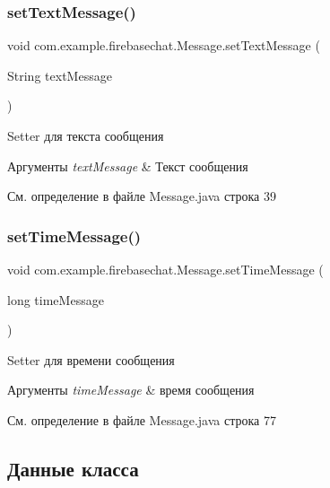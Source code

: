 \subsubsection{\texorpdfstring{set\+Text\+Message()}{setTextMessage()}}
{\footnotesize\ttfamily void com.\+example.\+firebasechat.\+Message.\+set\+Text\+Message (\begin{DoxyParamCaption}\item[{String}]{text\+Message }\end{DoxyParamCaption})}



Setter для текста сообщения 


\begin{DoxyParams}{Аргументы}
{\em text\+Message} & Текст сообщения \\
\hline
\end{DoxyParams}


См. определение в файле Message.\+java строка 39

\mbox{\label{classcom_1_1example_1_1firebasechat_1_1_message_a49fdc6fad71c37aa636d43400c8c63bc}} 
\subsubsection{\texorpdfstring{set\+Time\+Message()}{setTimeMessage()}}
{\footnotesize\ttfamily void com.\+example.\+firebasechat.\+Message.\+set\+Time\+Message (\begin{DoxyParamCaption}\item[{long}]{time\+Message }\end{DoxyParamCaption})}



Setter для времени сообщения 


\begin{DoxyParams}{Аргументы}
{\em time\+Message} & время сообщения \\
\hline
\end{DoxyParams}


См. определение в файле Message.\+java строка 77



\subsection{Данные класса}
\mbox{\label{classcom_1_1example_1_1firebasechat_1_1_message_a8d952ef9a02a74e7c419f335020fea23}} 
